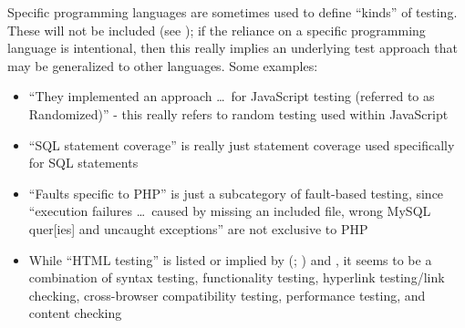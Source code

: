 Specific programming languages are sometimes used to define ``kinds'' of
testing. These will not be included (see ); if the reliance
on a specific programming language is intentional, then this really implies an
underlying test approach that may be generalized to other languages. Some
examples:

\begin{itemize}
      \item ``They implemented an approach \dots\ for JavaScript testing
            (referred to as Randomized)'' \citep[p.~192]{DoğanEtAl2014} -
            this really refers to random testing used within JavaScript
      \item ``SQL statement coverage'' is really just statement coverage
            used specifically for SQL statements \citep[Tab.~13]{DoğanEtAl2014}
      \item ``Faults specific to PHP'' is just a subcategory of fault-based
            testing, since ``execution failures \dots\ caused by missing an
            included file, wrong MySQL quer[ies] and uncaught exceptions''
            are not exclusive to PHP \citep[Tab.~27]{DoğanEtAl2014}
      \item While ``HTML testing'' is listed or implied by
            \citeauthor{Gerrard2000a} (\citeyear[Tab.~2]{Gerrard2000a};
            \citeyear[Tab.~1, p.~3]{Gerrard2000b}) and
            \citet[p.~220]{Patton2006}, it seems to be a combination of syntax
            testing, functionality testing, hyperlink testing/link checking,
            cross-browser compatibility testing, performance testing, and
            content checking \citep[p.~3]{Gerrard2000b}
\end{itemize}

